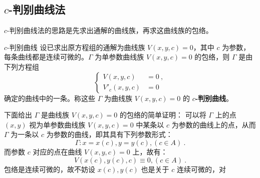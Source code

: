 \subsection{$c$-判别曲线法}\label{sub_ODEa6_2}
$c$-判别曲线法的思路是先求出通解的曲线族，再求这曲线族的包络。
\begin{definition}{$c$-判别曲线}
设已求出原方程组的通解为曲线族 $V(x,y,c)=0$，其中 $c$ 为参数，每条曲线都是连续可微的。$\Gamma$ 为单参数曲线族 $V(x,y,c)=0$ 的包络，则 $\Gamma$ 是由下列方程组
\begin{equation}\label{eq_ODEa6_3}
\left \{
\begin{aligned}
V(x,y,c) &= 0~,\\
V'_c(x,y,c) &= 0~
\end{aligned}
\right .
\end{equation}
确定的曲线中的一条。称这些 $\Gamma$ 为曲线族 $V(x,y,c)=0$ 的 \textbf{$c$-判别曲线}。
\end{definition}
下面给出 $\Gamma$ 是曲线族 $V(x,y,c)=0$ 的包络的简单证明：
可以将 $\Gamma$ 上的点 $(x, y)$ 视为单参数曲线族 $V(x,y,c)=0$ 中某条以 $c$ 为参数的曲线上的点，从而 $\Gamma$ 为一条以 $c$ 为参数的曲线，即其具有下列参数形式：
\begin{equation}
\Gamma: x=x(c), y=y(c), (c \in A) ~.
\end{equation}
而参数 $c$ 对应的点在曲线 $V(x,y,c)=0$ 上，故有：
\begin{equation}\label{eq_ODEa6_4}
V(x(c), y(c), c) \equiv 0, (c \in A) ~.
\end{equation}
包络是连续可微的，故不妨设 $x(c), y(c)$ 也是关于 $c$ 连续可微的，对 \